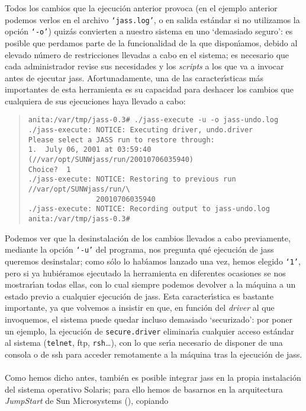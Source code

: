 Todos los cambios que la ejecuci\'on anterior provoca (en el ejemplo anterior
podemos verlos en el archivo {\tt `jass.log'}, o en salida est\'andar si no
utilizamos la opci\'on {\tt `-o'}) quiz\'as convierten a
nuestro sistema en uno `demasiado seguro': es posible que perdamos parte de la
funcionalidad de la que dispon\'{\i}amos, debido al elevado n\'umero de 
restricciones llevadas a cabo en el sistema; es necesario que cada administrador
revise sus necesidades y los {\it scripts} a los que va a invocar antes de
ejecutar {\sc jass}. Afortunadamente, una de las caracter\'{\i}sticas m\'as
importantes de esta herramienta es su capacidad para deshacer los cambios que
cualquiera de sus ejecuciones haya llevado a cabo:
\begin{quote}
\begin{verbatim}
anita:/var/tmp/jass-0.3# ./jass-execute -u -o jass-undo.log
./jass-execute: NOTICE: Executing driver, undo.driver
Please select a JASS run to restore through:
1.  July 06, 2001 at 03:59:40 (//var/opt/SUNWjass/run/20010706035940)
Choice?  1
./jass-execute: NOTICE: Restoring to previous run //var/opt/SUNWjass/run/\
                20010706035940
./jass-execute: NOTICE: Recording output to jass-undo.log
anita:/var/tmp/jass-0.3# 
\end{verbatim}
\end{quote}
Podemos ver que la desinstalaci\'on de los cambios llevados a cabo previamente,
mediante la opci\'on {\tt `-u'} del programa, nos pregunta qu\'e ejecuci\'on
de {\sc jass} queremos desinstalar; como s\'olo lo hab\'{\i}amos lanzado una
vez, hemos elegido {\tt `1'}, pero si ya hubi\'eramos ejecutado la herramienta
en diferentes ocasiones se nos mostrar\'{\i}an todas ellas, con lo cual siempre
podemos devolver a la m\'aquina a un estado previo a cualquier ejecuci\'on de
{\sc jass}. Esta caracter\'{\i}stica es bastante importante, ya que volvemos a
insistir en que, en funci\'on del {\it driver} al que invoquemos, el sistema
puede quedar incluso demasiado `securizado': por poner un ejemplo, la 
ejecuci\'on de {\tt secure.driver} eliminar\'{\i}a cualquier acceso est\'andar
al sistema ({\tt telnet}, {\sc ftp}, {\tt rsh}\ldots), con lo que ser\'{\i}a
necesario de disponer de una consola o de {\sc ssh} para acceder remotamente a
la m\'aquina tras la ejecuci\'on de {\sc jass}.\\
\\Como hemos dicho antes, tambi\'en es posible integrar {\sc jass} en la propia
instalaci\'on del sistema operativo Solaris; para ello hemos de basarnos en la 
arquitectura {\it JumpStart} de Sun Microsystems (\cite{kn:noo01e}), copiando 

